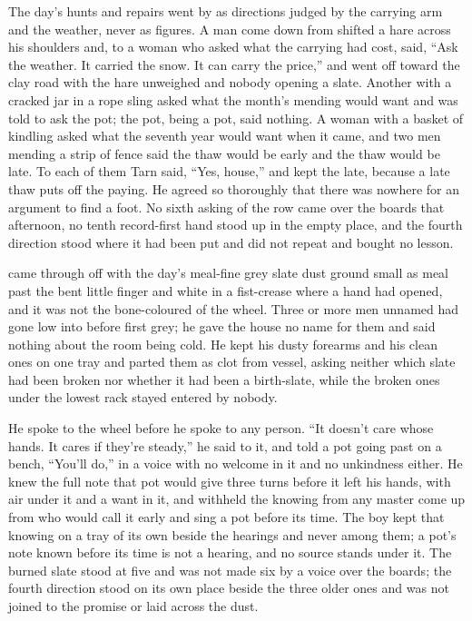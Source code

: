 The day's hunts and repairs went by as directions judged by the carrying arm and the weather, never as figures. A man come down from  shifted a hare across his shoulders and, to a woman who asked what the carrying had cost, said, “Ask the weather. It carried the snow. It can carry the price,” and went off toward the clay road with the hare unweighed and nobody opening a slate. Another with a cracked jar in a rope sling asked what the month's mending would want and was told to ask the pot; the pot, being a pot, said nothing. A woman with a basket of kindling asked what the seventh year would want when it came, and two men mending a strip of fence said the thaw would be early and the thaw would be late. To each of them Tarn said, “Yes, house,” and kept the late, because a late thaw puts off the paying. He agreed so thoroughly that there was nowhere for an argument to find a foot. No sixth asking of the row came over the boards that afternoon, no tenth record-first hand stood up in the empty place, and the fourth direction stood where it had been put and did not repeat and bought no lesson.

\scenebreak

 came through  off  with the day's meal-fine grey slate dust ground small as meal past the bent little finger and white in a fist-crease where a hand had opened, and it was not the bone-coloured  of the wheel. Three or more men unnamed had gone low into  before first grey; he gave the house no name for them and said nothing about the room being cold. He kept his dusty forearms and his clean ones on one tray and parted them as clot from vessel, asking neither which slate had been broken nor whether it had been a birth-slate, while the broken ones under the lowest rack stayed entered by nobody.

He spoke to the wheel before he spoke to any person. “It doesn't care whose hands. It cares if they're steady,” he said to it, and told a pot going past on a bench, “You'll do,” in a voice with no welcome in it and no unkindness either. He knew the full note that pot would give three turns before it left his hands, with air under it and a want in it, and withheld the knowing from any master come up from  who would call it early and sing a pot before its time. The boy kept that knowing on a tray of its own beside the hearings and never among them; a pot's note known before its time is not a hearing, and no source stands under it. The burned slate stood at five and was not made six by a voice over the boards; the fourth direction stood on its own place beside the three older ones and was not joined to the promise or laid across the dust.

